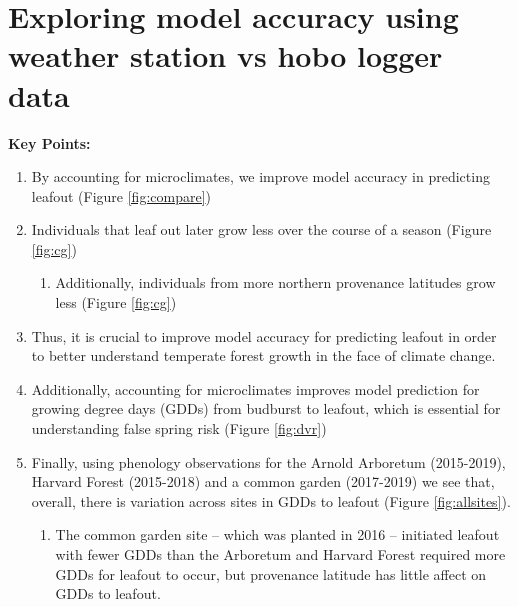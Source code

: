 \documentclass{article}\usepackage[]{graphicx}\usepackage[]{color}
\begin{document}
\renewcommand{\thetable}{\arabic{table}}
\renewcommand{\thefigure}{\arabic{figure}}
\renewcommand{\labelitemi}{$-$}

\renewcommand{\thesection}{\arabic{section}.}
\renewcommand\thesubsection{\arabic{section}.\arabic{subsection}} 

\section*{Exploring model accuracy using weather station vs hobo logger data}

\large{\textbf{Key Points:}
\begin{enumerate}
\item By accounting for microclimates, we improve model accuracy in predicting leafout (Figure \ref{fig:compare})
\item Individuals that leaf out later grow less over the course of a season (Figure \ref{fig:cg})
  \begin{enumerate}
  \item Additionally, individuals from more northern provenance latitudes grow less (Figure \ref{fig:cg})
  \end{enumerate}
\item Thus, it is crucial to improve model accuracy for predicting leafout in order to better understand temperate forest growth in the face of climate change. 
\item Additionally, accounting for microclimates improves model prediction for growing degree days (GDDs) from budburst to leafout, which is essential for understanding false spring risk (Figure \ref{fig:dvr})
\item Finally, using phenology observations for the Arnold Arboretum (2015-2019), Harvard Forest (2015-2018) and a common garden (2017-2019) we see that, overall, there is variation across sites in GDDs to leafout (Figure \ref{fig:allsites}). 
  \begin{enumerate}
  \item The common garden site -- which was planted in 2016 -- initiated leafout with fewer GDDs than the Arboretum and Harvard Forest required more GDDs for leafout to occur, but provenance latitude has little affect on GDDs to leafout. 
  \end{enumerate}
\end{enumerate}

}
\end{document}
